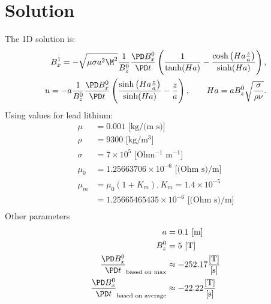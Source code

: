 \documentclass[11pt]{article}
\begin{document}
\doublespacing
\MOONSTITLE
\maketitle

\section{Solution}
The 1D solution is:
\begin{equation}\begin{aligned}
B_x^1 = - \sqrt{\mu \sigma a^2 \M^2} \frac{1}{B_z^0} \frac{\PD B_x^0}{\PD t} \left( \frac{1}{\tanh(Ha)} -  \frac{\cosh \left(Ha \frac{z}{a} \right)}{\sinh(Ha)}\right), \\
u   = -a \frac{1}{B_z^0} \frac{\PD B_x^0}{\PD t} \left( \frac{\sinh\left(Ha \frac{z}{a} \right)}{\sinh(Ha)} - \frac{z}{a} \right), \qquad
Ha = a B_z^0 \sqrt{\frac{\sigma}{\rho \nu}}. \\
\end{aligned} \end{equation}
Using values for lead lithium:
\begin{equation}\begin{aligned}
\mu    & = 0.001 \text{ [kg/(m s)]} \\
\rho   & = 9300 \text{ [kg/m$^3$]} \\
\sigma & = 7 \times 10^5 \text{ [Ohm$^{-1}$ m$^{-1}$]} \\
\mu_0  & = 1.25663706    \times 10^{-6} \text{ [(Ohm s)/m]} \\
\mu_m  & = \mu_0 (1+K_m), K_m = 1.4 \times 10^{-5} \\
       & = 1.25665465435 \times 10^{-6} \text{ [(Ohm s)/m]} \\
\end{aligned} \end{equation}
Other parameters
\begin{equation}\begin{aligned}
a                       & = 0.1 \text{ [m]}\\
B_z^0                   & = 5 \text{ [T]}\\
\frac{\PD B_x^0}{\PD t}_{\text{based on max}} & \approx -252.17 \frac{\text{[T]}}{\text{[s]}} \\
\frac{\PD B_x^0}{\PD t}_{\text{based on average}} & \approx -22.22 \frac{\text{[T]}}{\text{[s]}} \\
\end{aligned} \end{equation}
\end{document}
